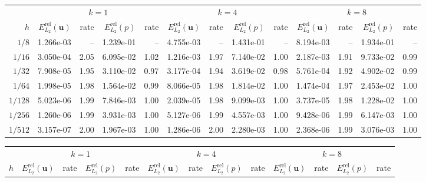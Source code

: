 \begin{landscape}
\thispagestyle{empty}
\begin{center}
\centering
{}
\label{tab:annulus_thieulot_v2_p0_disc}
\small
\begin{tabular}{
r rr rr rr rr rr rr
}
\toprule
& \multicolumn{4}{c}{$k=1$} & \multicolumn{4}{c}{$k=4$} & \multicolumn{4}{c}{$k=8$} \\
\cmidrule(lr){2-5}\cmidrule(lr){6-9}\cmidrule(lr){10-13}
$h$ & $E^{\mathrm{rel}}_{L_2}(\mathbf{u})$ & rate & $E^{\mathrm{rel}}_{L_2}(p)$ & rate & $E^{\mathrm{rel}}_{L_2}(\mathbf{u})$ & rate & $E^{\mathrm{rel}}_{L_2}(p)$ & rate & $E^{\mathrm{rel}}_{L_2}(\mathbf{u})$ & rate & $E^{\mathrm{rel}}_{L_2}(p)$ & rate \\
\midrule
$1/8$ & 1.266e-03 & -- & 1.239e-01 & -- & 4.755e-03 & -- & 1.431e-01 & -- & 8.194e-03 & -- & 1.934e-01 & -- \\
$1/16$ & 3.050e-04 & 2.05 & 6.095e-02 & 1.02 & 1.216e-03 & 1.97 & 7.140e-02 & 1.00 & 2.187e-03 & 1.91 & 9.733e-02 & 0.99 \\
$1/32$ & 7.908e-05 & 1.95 & 3.110e-02 & 0.97 & 3.177e-04 & 1.94 & 3.619e-02 & 0.98 & 5.761e-04 & 1.92 & 4.902e-02 & 0.99 \\
$1/64$ & 1.998e-05 & 1.98 & 1.564e-02 & 0.99 & 8.066e-05 & 1.98 & 1.814e-02 & 1.00 & 1.474e-04 & 1.97 & 2.453e-02 & 1.00 \\
$1/128$ & 5.023e-06 & 1.99 & 7.846e-03 & 1.00 & 2.039e-05 & 1.98 & 9.099e-03 & 1.00 & 3.737e-05 & 1.98 & 1.228e-02 & 1.00 \\
$1/256$ & 1.260e-06 & 1.99 & 3.931e-03 & 1.00 & 5.127e-06 & 1.99 & 4.557e-03 & 1.00 & 9.428e-06 & 1.99 & 6.147e-03 & 1.00 \\
$1/512$ & 3.157e-07 & 2.00 & 1.967e-03 & 1.00 & 1.286e-06 & 2.00 & 2.280e-03 & 1.00 & 2.368e-06 & 1.99 & 3.076e-03 & 1.00 \\
\bottomrule
\end{tabular}
\end{center}
\begin{center}
\centering
{}
\label{tab:annulus_thieulot_v2_p1_disc}
\small
\begin{tabular}{
r rr rr rr rr rr rr
}
\toprule
& \multicolumn{4}{c}{$k=1$} & \multicolumn{4}{c}{$k=4$} & \multicolumn{4}{c}{$k=8$} \\
\cmidrule(lr){2-5}\cmidrule(lr){6-9}\cmidrule(lr){10-13}
$h$ & $E^{\mathrm{rel}}_{L_2}(\mathbf{u})$ & rate & $E^{\mathrm{rel}}_{L_2}(p)$ & rate & $E^{\mathrm{rel}}_{L_2}(\mathbf{u})$ & rate & $E^{\mathrm{rel}}_{L_2}(p)$ & rate & $E^{\mathrm{rel}}_{L_2}(\mathbf{u})$ & rate & $E^{\mathrm{rel}}_{L_2}(p)$ & rate \\

\end{tabular}
\end{center}
\end{landscape}
